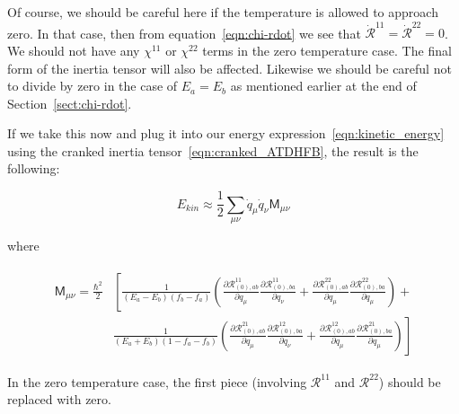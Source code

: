 \noindent Of course, we should be careful here if the temperature is allowed to approach zero. In that case, then from equation~\eqref{eqn:chi-rdot} we see that $\mathcal{\dot{R}}^{11}=\mathcal{\dot{R}}^{22}=0$. We should not have any $\chi^{11}$ or $\chi^{22}$ terms in the zero temperature case. The final form of the inertia tensor will also be affected. Likewise we should be careful not to divide by zero in the case of $E_a=E_b$ as mentioned earlier at the end of Section~\ref{sect:chi-rdot}.%

If we take this now and plug it into our energy expression~\eqref{eqn:kinetic_energy} using the cranked inertia tensor~\eqref{eqn:cranked_ATDHFB}, the result is the following:

\begin{tcolorbox}
	\begin{equation}
	E_{kin} \approx \frac{1}{2}\sum_{\mu\nu}\dot{q}_\mu\dot{q}_\nu\mathsf{M}_{\mu\nu}
	\end{equation}
\end{tcolorbox}

\noindent where

\begin{tcolorbox}
	\begin{align}\label{crankedFiniteTempInertia}
	\begin{aligned}
	\mathsf{M}_{\mu\nu} =  \frac{\hbar^2}{2}&\left[\frac{1}{(E_a-E_b)(f_b-f_a)}\left(\frac{\partial\mathcal{R}^{11}_{(0),ab}}{\partial q_\mu}\frac{\partial\mathcal{R}^{11}_{(0),ba}}{\partial q_\nu}+\frac{\partial\mathcal{R}^{22}_{(0),ab}}{\partial q_\mu}\frac{\partial\mathcal{R}^{22}_{(0),ba}}{\partial q_\mu}\right)\right.+ \\
	&\left.\frac{1}{(E_a+E_b)(1-f_a-f_b)}\left(\frac{\partial\mathcal{R}^{21}_{(0),ab}}{\partial q_\mu}\frac{\partial\mathcal{R}^{12}_{(0),ba}}{\partial q_\nu}+\frac{\partial\mathcal{R}^{12}_{(0),ab}}{\partial q_\mu}\frac{\partial\mathcal{R}^{21}_{(0),ba}}{\partial q_\mu}\right)\right]
	\end{aligned}
	\end{align}
\end{tcolorbox}

\noindent In the zero temperature case, the first piece (involving $\mathcal{R}^{11}$ and $\mathcal{R}^{22}$) should be replaced with zero.


